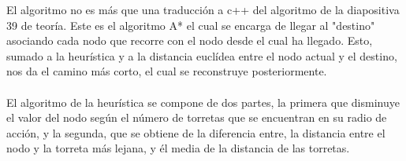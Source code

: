 El algoritmo no es más que una traducción a c++ del algoritmo de la diapositiva 39 de teoría. Este es el algoritmo A* el cual se encarga de llegar al "destino" asociando cada nodo que recorre con el nodo desde el cual ha llegado. Esto, sumado a la heurística y a la distancia euclídea entre el nodo actual y el destino, nos da el camino más corto, el cual se reconstruye posteriormente.\\
\\
El algoritmo de la heurística se compone de dos partes, la primera que disminuye el valor del nodo según el número de torretas que se encuentran en su radio de acción, y la segunda, que se obtiene de la diferencia entre, la distancia entre el nodo y la torreta más lejana, y él media de la distancia de las torretas.\\
\\